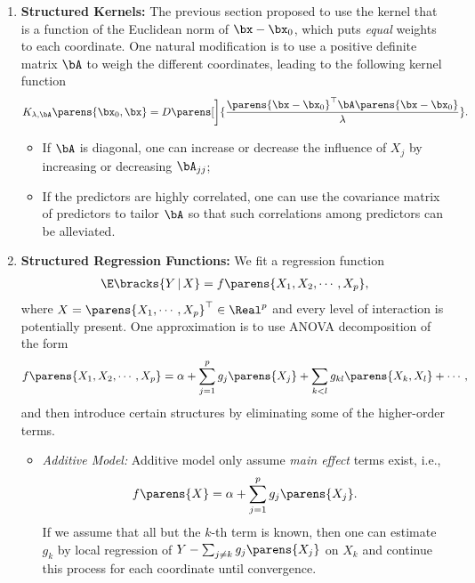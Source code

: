 \documentclass[12pt]{article}
\begin{document}
\begin{enumerate}[label=\textbf{\arabic*.}]

	\item \textbf{Structured Kernels:} The previous section proposed to use the kernel that is a function of the Euclidean norm of $\bx - \bx_0$, which puts \emph{equal} weights to each coordinate. One natural modification is to use a positive definite matrix $\bA$ to weigh the different coordinates, leading to the following kernel function  
	\begin{align*}
		K_{\lambda, \bA} \parens{\bx_0, \bx} = D \parens[\bigg]{\frac{ \parens{\bx - \bx_0}^\top \bA \parens{\bx - \bx_0}}{\lambda}}. 
	\end{align*}
	
	\begin{itemize}
		\item If $\bA$ is diagonal, one can increase or decrease the influence of $X_j$ by increasing or decreasing $\bA_{jj}$; 
		\item If the predictors are highly correlated, one can use the covariance matrix of predictors to tailor $\bA$ so that such correlations among predictors can be alleviated. 
	\end{itemize}
	
	\item \textbf{Structured Regression Functions:} We fit a regression function 
	\begin{align*}
		\E \bracks{Y \,\vert\, X} = f \parens{X_1, X_2, \cdots, X_p}, 
	\end{align*}
	where $X = \parens{X_1, \cdots, X_p}^\top \in \Real^p$ and every level of interaction is potentially present. One approximation is to use ANOVA decomposition of the form 
	\begin{equation}\label{srf}
		f \parens{X_1, X_2, \cdots, X_p} = \alpha + \sum_{j=1}^p g_j \parens{X_j} + \sum_{k<l} g_{kl} \parens{X_k, X_l} + \cdots, 
	\end{equation}
	and then introduce certain structures by eliminating some of the higher-order terms. 
	\begin{itemize}
		\item \textit{Additive Model:} Additive model only assume \emph{main effect} terms exist, i.e., 
		\begin{align*}
			f \parens{X} = \alpha + \sum_{j=1}^p g_j \parens{X_j}. 
		\end{align*}
		If we assume that all but the $k$-th term is known, then one can estimate $g_k$ by local regression of $Y - \sum_{j \ne k} g_j \parens{X_j}$ on $X_k$ and continue this process for each coordinate until convergence. 
		

\end{itemize}
\end{enumerate}
\end{document}
